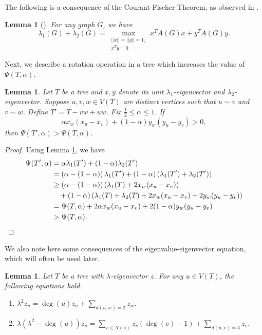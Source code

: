 \documentclass[11pt]{article}
\theoremstyle{plain}
\newtheorem{lemma}[theorem]{Lemma}
\numberwithin{equation}{section}
\begin{document}
The following is a consequence of the Courant-Fischer Theorem, as observed in \cite{Ebrahimi_Mohar_Nikiforov_Ahmady_2008}. 

\begin{lemma}[\cite{Ebrahimi_Mohar_Nikiforov_Ahmady_2008}]\label{lemma:spectral_sum}
For any graph $G$, we have
    \[\lambda_1(G) + \lambda_2(G) = \max_{\substack{||x||=||y||=1,\\ x^Ty = 0}} x^TA(G)x + y^TA(G)y.\]
\end{lemma}

Next, we describe a rotation operation in a tree which increases the value of $\Psi(T, \alpha)$. 

\begin{lemma}\label{lemma:rotation_alpha}
   Let $T$ be a tree and $x,y$ denote its unit $\lambda_1$-eigenvector and $\lambda_2$-eigenvector. Suppose $u, v, w\in V(T)$ are distinct vertices such that $u\sim v$ and $v\sim w$. Define $T' = T - vw + uw$. Fix $\frac{1}{2}\le \alpha \le 1$. If \[\alpha x_w(x_u - x_v) + (1-\alpha)y_w(y_u - y_v)>0,\] then 
   $\Psi(T', \alpha) > \Psi(T, \alpha)$.
\end{lemma}

\begin{proof}
    Using Lemma \ref{lemma:spectral_sum}, we have 
    \begin{align*}
        \Psi(T', \alpha) & = \alpha \lambda_1(T') + (1-\alpha)\lambda_2(T')\\
         &  =\left(\alpha - (1-\alpha)\right)\lambda_1(T')  + (1-\alpha)\left(\lambda_1(T') + \lambda_2(T')\right)\\
         & \ge \left(\alpha - (1-\alpha)\right)\left(\lambda_1(T) + 2x_w(x_u - x_v)\right) \\
         & \quad + (1-\alpha)\left(\lambda_1(T) + \lambda_2(T) + 2x_w(x_u - x_v) + 2y_w(y_u - y_v)\right)\\
         & = \Psi(T, \alpha) + 2\alpha x_w(x_u - x_v) + 2(1-\alpha)y_w(y_u - y_v)\\
         & > \Psi(T, \alpha). \qedhere
    \end{align*}
\end{proof}

We also note here some consequences of the eigenvalue-eigenvector equation, which will often be used later.

\begin{lemma}\label{lemma:eigenvalue_equations}
Let $T$ be a tree with $\lambda$-eigenvector $z$. For any $u\in V(T)$, the following equations hold.
   \begin{enumerate}[$(i)$]
       \item $\lambda^2z_u = \deg(u)z_u + \sum_{d(u,w) = 2} z_w$. 
       \item $ \lambda\left(\lambda^2 - \deg(u)\right)z_u = \sum_{v\in N(u)}z_v (\deg(v)-1) + \sum_{d(u,v) = 3}z_v$.
   \end{enumerate}
\end{lemma}
\end{document}
